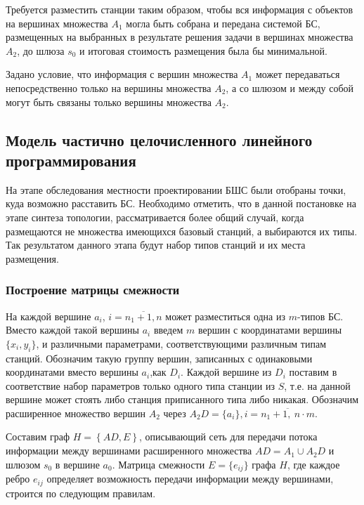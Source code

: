 Требуется разместить станции таким образом, чтобы вся информация с объектов на вершинах множества $A_1$ могла быть собрана и передана системой БС, размещенных на выбранных в результате решения задачи в вершинах множества  $A_2$, до шлюза $s_0$ и итоговая стоимость размещения была бы минимальной.


Задано условие, что информация с вершин множества $A_1$ может передаваться непосредственно только на вершины множества $A_2$, а со шлюзом и между собой могут быть связаны только вершины множества $A_2$.

\subsection{Модель частично целочисленного линейного программирования}

На этапе обследования местности проектировании БШС были отобраны точки, куда возможно расставить БС. Необходимо отметить, что в данной постановке на этапе синтеза топологии, рассматривается более общий случай, когда размещаются не множества имеющихся базовый станций, а выбираются их типы. Так результатом данного этапа будут набор типов станций и их места размещения.

\subsubsection{Построение матрицы смежности}

На каждой вершине $a_i$, $i= \overline{n_1+1,n}$ может разместиться одна из $m$-типов БС. Вместо каждой такой вершины $a_i$ введем $m$ вершин с координатами вершины $\{x_i, y_i \}$, и различными параметрами, соответствующими различным типам станций. Обозначим такую группу вершин, записанных с одинаковыми координатами вместо вершины $a_i$,как $D_i$. Каждой вершине из $D_i$ поставим в соответствие набор параметров только одного типа станции из $S$, т.е. на данной вершине может стоять либо станция приписанного типа либо никакая. Обозначим расширенное множество вершин $A_2$ через $A_2D = \{a_i\}, i = \overline{n_1 + 1,\ n \cdot m}$.



Составим граф $H=\left\{AD,E\right\}$, описывающий сеть для передачи потока информации между вершинами расширенного множества $AD=A_1 \cup A_2D$ и шлюзом $s_0$ в вершине $a_0$.
Матрица смежности $E = \{e_{ij} \}$ графа $H$, где каждое ребро $e_{ij}$ определяет возможность передачи информации между вершинами, строится по следующим правилам. 

